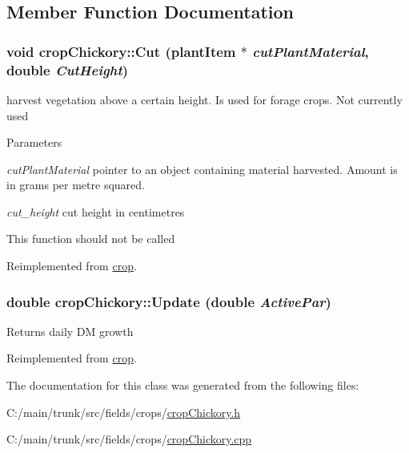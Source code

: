 \subsection{Member Function Documentation}
\hypertarget{classcrop_chickory_ad29787a097e6f6239285473a1b5c85ad}{
\subsubsection[{Cut}]{\setlength{\rightskip}{0pt plus 5cm}void cropChickory::Cut ({\bf plantItem} $\ast$ {\em cutPlantMaterial}, \/  double {\em CutHeight})}}
\label{classcrop_chickory_ad29787a097e6f6239285473a1b5c85ad}


harvest vegetation above a certain height. Is used for forage crops. Not currently used 
\begin{DoxyParams}{Parameters}
\item[{\em cutPlantMaterial}]pointer to an object containing material harvested. Amount is in grams per metre squared. \item[{\em cut\_\-height}]cut height in centimetres\end{DoxyParams}
This function should not be called 

Reimplemented from \hyperlink{classcrop_a5b2a6a3522c64790e295055ff164dc10}{crop}.\hypertarget{classcrop_chickory_adef10cd7666f588810ba6d71c581e289}{
\subsubsection[{Update}]{\setlength{\rightskip}{0pt plus 5cm}double cropChickory::Update (double {\em ActivePar})}}
\label{classcrop_chickory_adef10cd7666f588810ba6d71c581e289}
Returns daily DM growth 

Reimplemented from \hyperlink{classcrop_a9ed02462e332fffb65498075e7499bf4}{crop}.

The documentation for this class was generated from the following files:\begin{DoxyCompactItemize}
\item 
C:/main/trunk/src/fields/crops/\hyperlink{crop_chickory_8h}{cropChickory.h}\item 
C:/main/trunk/src/fields/crops/\hyperlink{crop_chickory_8cpp}{cropChickory.cpp}\end{DoxyCompactItemize}
